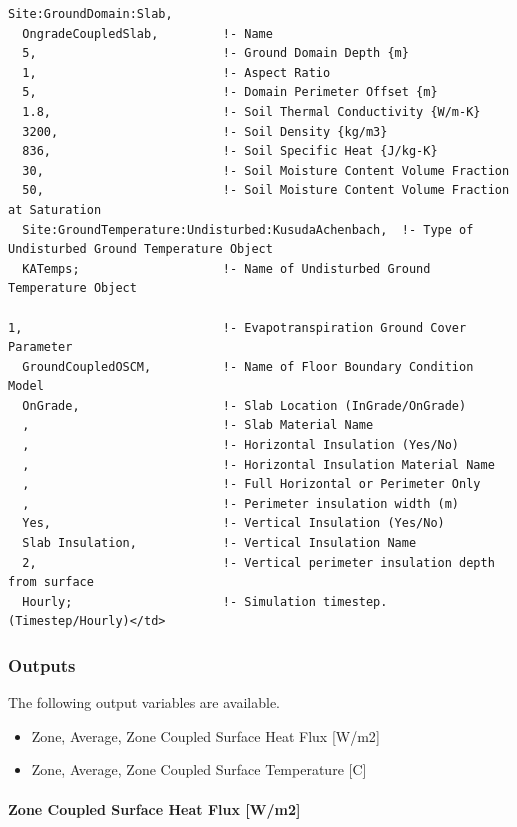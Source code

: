 \begin{lstlisting}
Site:GroundDomain:Slab,
  OngradeCoupledSlab,         !- Name
  5,                          !- Ground Domain Depth {m}
  1,                          !- Aspect Ratio
  5,                          !- Domain Perimeter Offset {m}
  1.8,                        !- Soil Thermal Conductivity {W/m-K}
  3200,                       !- Soil Density {kg/m3}
  836,                        !- Soil Specific Heat {J/kg-K}
  30,                         !- Soil Moisture Content Volume Fraction
  50,                         !- Soil Moisture Content Volume Fraction at Saturation
  Site:GroundTemperature:Undisturbed:KusudaAchenbach,  !- Type of Undisturbed Ground Temperature Object
  KATemps;                    !- Name of Undisturbed Ground Temperature Object

1,                            !- Evapotranspiration Ground Cover Parameter
  GroundCoupledOSCM,          !- Name of Floor Boundary Condition Model
  OnGrade,                    !- Slab Location (InGrade/OnGrade)
  ,                           !- Slab Material Name
  ,                           !- Horizontal Insulation (Yes/No)
  ,                           !- Horizontal Insulation Material Name
  ,                           !- Full Horizontal or Perimeter Only
  ,                           !- Perimeter insulation width (m)
  Yes,                        !- Vertical Insulation (Yes/No)
  Slab Insulation,            !- Vertical Insulation Name
  2,                          !- Vertical perimeter insulation depth from surface
  Hourly;                     !- Simulation timestep. (Timestep/Hourly)</td>
\end{lstlisting}

\subsubsection{Outputs}\label{outputs-1-015}

The following output variables are available.

\begin{itemize}
\tightlist
\item
  Zone, Average, Zone Coupled Surface Heat Flux {[}W/m2{]}
\item
  Zone, Average, Zone Coupled Surface Temperature {[}C{]}
\end{itemize}

\paragraph{Zone Coupled Surface Heat Flux {[}W/m2{]}}\label{zone-coupled-surface-heat-flux-wm2}


